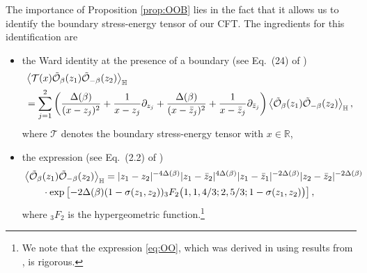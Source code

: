\documentclass[a4paper,11pt]{article}
\begin{document}
The importance of Proposition \ref{prop:OOB} lies in the fact that it allows us to identify the boundary stress-energy tensor of our CFT. The ingredients for this identification are
\begin{itemize}
    \item the Ward identity at the presence of a boundary (see Eq.\ (24) of \cite{CARDY2006333})
    \begin{align}
    \begin{split} \label{eq:Ward}
        & \Braket{\mathcal{T}(x) \tilde{\mathcal{O}}_{\beta}(z_1) \tilde{\mathcal{O}}_{-\beta}(z_2) }_{\mathbb{H}} \\
        &= \sum_{j=1}^2 \left( \frac{\Delta(\beta)}{(x-z_j)^2} + \frac{1}{x-z_j} \partial_{z_j} + \frac{\Delta(\beta)}{(x-\bar{z}_j)^2} + \frac{1}{x-\bar{z}_j} \partial_{\bar{z}_j} \right)
    \Braket{\tilde{\mathcal{O}}_{\beta}(z_1) \tilde{\mathcal{O}}_{-\beta}(z_2)}_{\mathbb{H}},
    \end{split}
    \end{align}
    where $\mathcal{T}$ denotes the boundary stress-energy tensor with $x \in \mathbb{R}$,
    \item the expression (see Eq.\ (2.2) of \cite{Camia_2020})
    \begin{align}
    \begin{split} \label{eq:OO}
    & \Braket{\tilde{\mathcal{O}}_{\beta}(z_1) \tilde{\mathcal{O}}_{-\beta}(z_2)}_{\mathbb{H}} = |z_1-z_2|^{-4\Delta(\beta)} |z_1-\bar{z}_2|^{4\Delta(\beta)} |z_1-\bar{z}_1|^{-2\Delta(\beta)} |z_2-\bar{z}_2|^{-2\Delta(\beta)} \\
    & \qquad \cdot \exp\left[ -2\Delta(\beta)(1-\sigma(z_1,z_2)) {}_3 F_2\big(1, 1, 4/3; 2, 5/3; 1-\sigma(z_1,z_2) \big)\right],
    \end{split}
    \end{align}
    where ${}_3 F_2$ is the hypergeometric function.\footnote{We note that the expression \eqref{eq:OO}, which was derived in \cite{Camia_2020} using results from \cite{han2017brownian,beliaev2013some}, is rigorous.}
\end{itemize}
\end{document}

